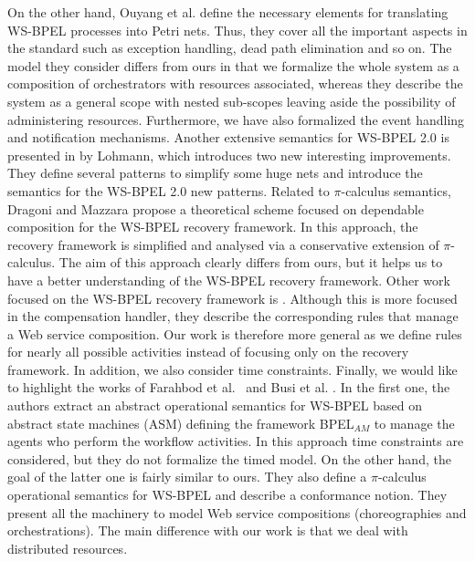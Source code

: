 On the other hand, Ouyang et al. \cite{Ouyang:2007} define the necessary elements for translating WS-BPEL processes into Petri nets. Thus, they
cover all the important aspects in the standard such as exception handling, dead path elimination and so on. The model they consider differs from ours in that we formalize the whole
system as a composition of orchestrators with resources associated, whereas they describe the system as a general scope with nested sub-scopes leaving aside the possibility of administering resources. Furthermore, we have also formalized the event handling and notification mechanisms.  
Another extensive semantics for WS-BPEL 2.0
is presented in \cite{Dumas:2008} by Lohmann, which introduces two new interesting improvements. They define several patterns to simplify some huge nets and introduce the semantics for the WS-BPEL 2.0 new patterns. Related to $\pi$-calculus semantics, Dragoni and Mazzara \cite{Dragoni:2009} 
propose a theoretical scheme focused on dependable composition for the  WS-BPEL recovery
framework. In this approach, the recovery framework is simplified
and analysed via a conservative extension of $\pi$-calculus. The
aim of this approach clearly differs from ours, but it helps us to have
a better understanding of the WS-BPEL recovery framework. Other work focused on the WS-BPEL
recovery framework is \cite{Qiu:2005}. Although this is more focused in the compensation handler, they describe the corresponding rules
that manage a Web service composition. Our work is therefore more general as we define rules for nearly all possible activities instead of focusing only on the recovery framework. In addition, we also consider time constraints. Finally, we would like to highlight the works of Farahbod et al.~\cite{Farahbod:2005} and Busi et al. \cite{Busi:2005}. In the first one, the authors extract an abstract operational semantics for WS-BPEL based on abstract state machines (ASM) defining the framework BPEL$_{AM}$ to manage the agents who perform the workflow activities. In this approach time constraints are considered, but they do not formalize the timed model. On the other hand, the goal of the latter one is fairly similar to ours. They also define a $\pi$-calculus operational semantics for WS-BPEL and describe a conformance notion. They present all the machinery to model Web service compositions (choreographies and orchestrations). The main difference with our work is that we deal with distributed resources. %

